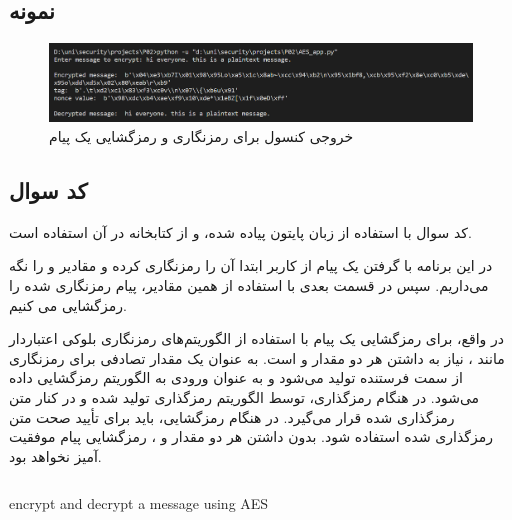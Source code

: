 \subsection{نمونه}
\begin{figure}[h!]
    \centering
    \includegraphics[width=0.9\linewidth]{images/AES.png}
    \caption{خروجی کنسول برای رمزنگاری و رمزگشایی یک پیام}
    \label{fig:addkey}
\end{figure}

\subsection{کد سوال}
 کد سوال با استفاده از زبان پایتون پیاده شده، و از کتابخانه
 در آن استفاده است. 
 
 در این برنامه با گرفتن یک پیام از کاربر ابتدا آن را رمزنگاری کرده و مقادیر
 و
 را نگه می‌داریم.
 سپس در قسمت بعدی با استفاده از همین مقادیر، پیام رمزنگاری شده را رمزگشایی می کنیم.

 در واقع، برای رمزگشایی یک پیام با استفاده از الگوریتم‌های رمزنگاری بلوکی اعتباردار مانند 
 ، نیاز به داشتن هر دو مقدار 
 و 
 است. 
 به عنوان یک مقدار تصادفی برای رمزنگاری از سمت فرستنده تولید می‌شود و به عنوان ورودی به الگوریتم رمزگشایی داده می‌شود. در هنگام رمزگذاری، 
 توسط الگوریتم رمزگذاری تولید شده و در کنار متن رمزگذاری شده قرار می‌گیرد. در هنگام رمزگشایی، 
 باید برای تأیید صحت متن رمزگذاری شده استفاده شود. بدون داشتن هر دو مقدار  
 و 
 ، رمزگشایی پیام موفقیت آمیز نخواهد بود.


\begin{latin}
\begin{listing}[ht]
    \inputminted{python}{sources/AES_app.py}
    \caption{encrypt and decrypt a message using AES}
    \label{code:aes}
\end{listing}
\end{latin}


